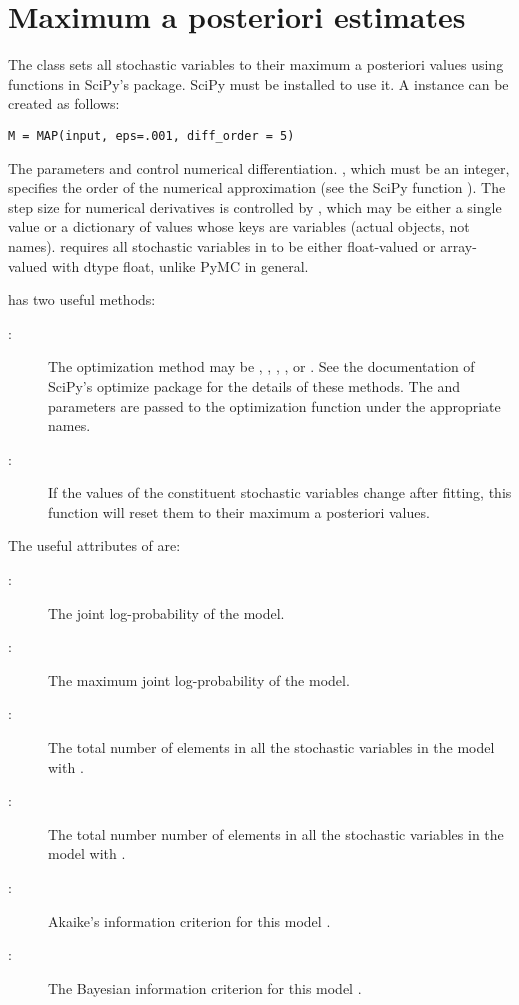 \hypertarget{MAP}{}
\section*{Maximum a posteriori estimates} \label{sec:MAP}

The  class sets all stochastic variables to their maximum a posteriori values using functions in SciPy's  package. SciPy must be installed to use it. A  instance  can be created as follows:
\begin{verbatim}
M = MAP(input, eps=.001, diff_order = 5)    
\end{verbatim}
The parameters  and  control numerical differentiation. , which must be an integer, specifies the order of the numerical approximation (see the SciPy function ). The step size for numerical derivatives is controlled by , which may be either a single value or a dictionary of values whose keys are variables (actual objects, not names).  requires all stochastic variables in  to be either float-valued or array-valued with dtype float, unlike PyMC in general.

 has two useful methods:
\begin{description}
    \item[:] The optimization method may be , , , , or . See the documentation of SciPy's optimize package for the details of these methods. The  and  parameters are passed to the optimization function under the appropriate names.
    \item[:] If the values of the constituent stochastic variables change after fitting, this function will reset them to their maximum a posteriori values.
\end{description}

The useful attributes of  are:
\begin{description}
    \item[:] The joint log-probability of the model.
    \item[:] The maximum joint log-probability of the model.
    \item[:] The total number of elements in all the stochastic variables in the model with .
    \item[:] The total number number of elements in all the stochastic variables in the model with .
    \item[:] Akaike's information criterion for this model \cite{Akaike:1973aj,Burnham:2002ic}.
    \item[:] The Bayesian information criterion for this model \cite{Schwarz:1978ud}.
\end{description}

